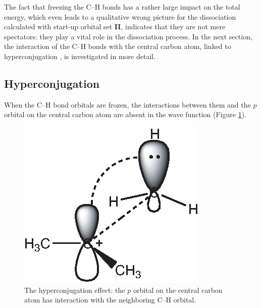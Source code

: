 The fact that freezing the C--H bonds has a rather large impact on the total energy, which even leads to a qualitative wrong picture for the dissociation calculated with start-up orbital set \textbf{II}, indicates that they are not mere spectators: they play a vital role in the dissociation process. In the next section, the interaction of the C--H bonds with the central carbon atom, linked to hyperconjugation \cite{march,mcmurry}, is investigated in more detail.
 
\subsection{Hyperconjugation}

When the C--H bond orbitals are frozen, the interactions between them and the $p$ orbital on the central carbon atom are absent in the wave function (Figure \ref{ch3.fig.hyperconjugation}).
\begin{figure}[ht]
\center
\includegraphics{dissociation/figures/hyperconj.eps}
\caption{The hyperconjugation effect: the $p$ orbital on the central carbon atom has interaction with the neighboring C--H orbital.}
\label{ch3.fig.hyperconjugation}
\end{figure}

